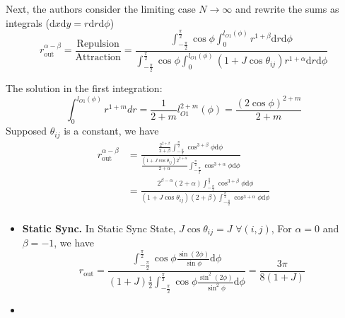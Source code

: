\documentclass[10pt,aspectratio=43,mathserif,table]{beamer}
\begin{document}
\begin{frame}
    Next, the authors consider the limiting case $N \rightarrow \infty$
    and rewrite the sums as integrals ($\mathrm{d}x\mathrm{d}y = r\mathrm{d}r\mathrm{d}\phi$)
    \vspace{-0.3cm}
    $$
    r_{\mathrm{out}}^{\alpha -\beta}=\frac{\mathrm{Repulsion}}{\mathrm{Attraction}}=\frac{\int_{-\frac{\pi}{2}}^{\frac{\pi}{2}}{\cos \phi \int_0^{l_{O1}\left( \phi \right)}{r^{1+\beta}\mathrm{d}r\mathrm{d}\phi}}}{\int_{-\frac{\pi}{2}}^{\frac{\pi}{2}}{\cos \phi \int_0^{l_{O1}\left( \phi \right)}{\left( 1+J\cos \theta _{ij} \right) r^{1+\alpha}\mathrm{d}r\mathrm{d}\phi}}}
    $$
\end{frame}

\begin{frame}
    The solution in the first integration: 
    $$
    \int_0^{l_{O1}\left( \phi \right)}{r^{1+m}dr}=\frac{1}{2+m}l_{O1}^{2+m}\left( \phi \right) =\frac{\left( 2\cos \phi \right) ^{2+m}}{2+m}
    $$
    Supposed $\theta_{ij}$ is a constant, we have
    $$
    \begin{aligned}
        r_{\mathrm{out}}^{\alpha -\beta}&=\frac{\frac{2^{2+\beta}}{2+\beta}\int_{-\frac{\pi}{2}}^{\frac{\pi}{2}}{\cos ^{3+\beta}\phi \mathrm{d}\phi}}{\frac{\left( 1+J\cos \theta _{ij} \right) 2^{2+\alpha}}{2+\alpha}\int_{-\frac{\pi}{2}}^{\frac{\pi}{2}}{\cos ^{3+\alpha}\phi \mathrm{d}\phi}}\\
        &=\frac{2^{\beta -\alpha}\left( 2+\alpha \right) \int_{-\frac{\pi}{2}}^{\frac{\pi}{2}}{\cos ^{3+\beta}\phi \mathrm{d}\phi}}{\left( 1+J\cos \theta _{ij} \right) \left( 2+\beta \right) \int_{-\frac{\pi}{2}}^{\frac{\pi}{2}}{\cos ^{3+\alpha}\phi \mathrm{d}\phi}}\\
    \end{aligned}
    $$



\end{frame}

\begin{frame}
    \begin{itemize}
        \item \textbf{Static Sync.} In Static Sync State, $J\cos \theta _{ij}=J\,\,\forall \left( i, j \right)$, For $\alpha = 0$ and $\beta=-1$, we have
        $$
            r_{\mathrm{out}}=\frac{\int_{-\frac{\pi}{2}}^{\frac{\pi}{2}}{\cos \phi \frac{\sin \left( 2\phi \right)}{\sin \phi}\mathrm{d}\phi}}{\left( 1+J \right) \frac{1}{2}\int_{-\frac{\pi}{2}}^{\frac{\pi}{2}}{\cos \phi \frac{\sin ^2\left( 2\phi \right)}{\sin ^2\phi}\mathrm{d}\phi}}=\frac{3\pi}{8\left( 1+J \right)}
        $$


        \item 
    \end{itemize}
\end{frame}




\end{document}
